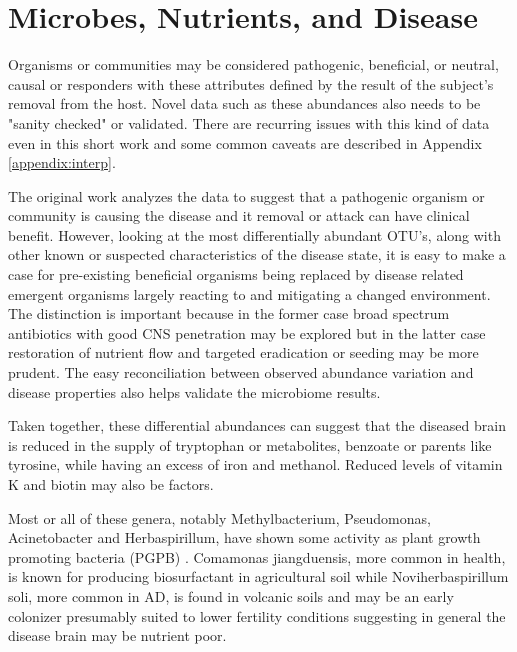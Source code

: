 \documentclass[aps,secnumarabic,balancelastpage,amsmath,amssymb,nofootinbib]{revtex4}
\newcommand{\mjmrefapp}[1]{Appendix   \ref{appendix:#1}}
\begin{document}
\putida

\thermotolerans

\diaphorobacter


\acinetobacter
\tjernbergiae





\section{ Microbes, Nutrients, and Disease }



Organisms or communities may be considered pathogenic,
beneficial, or neutral, causal or responders 
with these attributes defined by the result of
the subject's removal from the host. 
Novel data such as these abundances also needs to
be "sanity checked" or validated. 
There are recurring issues with this kind of data
even in this short work and some common caveats
are described in \mjmrefapp{interp}.

The original work \cite{10.3389/fcimb.2023.1123228}
 analyzes the data to suggest that  
 a pathogenic organism or community is causing the disease
and it removal or attack can have clinical benefit. 
However, looking at the most differentially abundant
OTU's, along with other known or suspected characteristics
of the disease state,
 it is easy to make a case for pre-existing beneficial organisms
being replaced by disease related emergent organisms 
largely reacting to and mitigating a changed environment. 
The distinction is important because in the former case
broad spectrum antibiotics with good CNS penetration may be
explored but in the latter case restoration of nutrient
flow and targeted eradication or seeding may be more prudent.
The easy reconciliation between observed abundance variation
and disease properties also helps validate the microbiome
results. 
 
Taken together, these  differential abundances
can suggest that
the diseased brain is reduced in the supply
of tryptophan or metabolites, benzoate or parents
like tyrosine, while having an excess of
iron and methanol. 
Reduced levels of vitamin K and biotin may also be factors. 


Most or  all of these genera, notably Methylbacterium, Pseudomonas,
Acinetobacter and Herbaspirillum, have shown some activity as 
plant growth promoting bacteria (PGPB) \cite{GomezGodinez_AguirreNoyola_MartinezRomero_Look_Plant_2023}.
Comamonas jiangduensis, more common in health, 
is known for producing biosurfactant in
agricultural soil \cite{Sun_Zhang_Chen_Comamonas_jiangduensis_2013}
while Noviherbaspirillum soli, more common in AD, is found in 
volcanic soils and may be  an early colonizer presumably
  suited to lower fertility conditions  suggesting in general
the disease brain may be nutrient poor.
\end{document}
